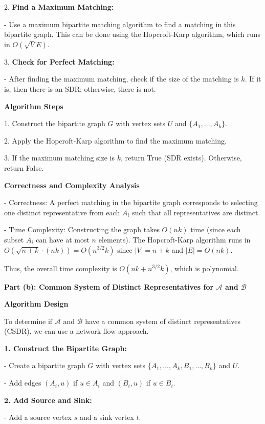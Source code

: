 \documentclass{oxmathproblems}
\begin{document}
\begin{questions}
2. \textbf{Find a Maximum Matching:}

   - Use a maximum bipartite matching algorithm to find a matching in this bipartite graph. This can be done using the Hopcroft-Karp algorithm, which runs in \( O(\sqrt{V} E) \).

3. \textbf{Check for Perfect Matching:}

   - After finding the maximum matching, check if the size of the matching is \( k \). If it is, then there is an SDR; otherwise, there is not.

\textbf{Algorithm Steps}

1. Construct the bipartite graph \( G \) with vertex sets \( U \) and \( \{A_1, \ldots, A_k\} \).

2. Apply the Hopcroft-Karp algorithm to find the maximum matching.

3. If the maximum matching size is \( k \), return True (SDR exists). Otherwise, return False.

\textbf{Correctness and Complexity Analysis}

- Correctness: A perfect matching in the bipartite graph corresponds to selecting one distinct representative from each \( A_i \) such that all representatives are distinct.

- Time Complexity: Constructing the graph takes \( O(nk) \) time (since each subset \( A_i \) can have at most \( n \) elements). The Hopcroft-Karp algorithm runs in \( O(\sqrt{n+k} \cdot (nk)) = O(n^{3/2} k) \) since \( |V| = n + k \) and \( |E| = O(nk) \).

Thus, the overall time complexity is \( O(nk + n^{3/2} k) \), which is polynomial.

\textbf{Part (b): Common System of Distinct Representatives for \(\mathcal{A}\) and \(\mathcal{B}\)}

\textbf{Algorithm Design}

To determine if \(\mathcal{A}\) and \(\mathcal{B}\) have a common system of distinct representatives (CSDR), we can use a network flow approach.

\textbf{1. Construct the Bipartite Graph:}

   - Create a bipartite graph \( G \) with vertex sets \( \{A_1, \ldots, A_k, B_1, \ldots, B_k\} \) and \( U \).
   
   - Add edges \( (A_i, u) \) if \( u \in A_i \) and \( (B_i, u) \) if \( u \in B_i \).

\textbf{2. Add Source and Sink:}

   - Add a source vertex \( s \) and a sink vertex \( t \).
   

\end{questions}
\end{document}
